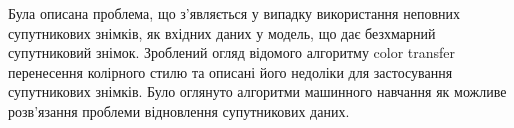 \clearpage
\chapterConclusion
Була описана проблема, що з’являється у випадку використання неповних
супутникових знімків, як вхідних даних у модель, що дає безхмарний
супутниковий знімок. Зроблений огляд відомого алгоритму color transfer
перенесення колірного стилю та описані його недоліки для застосування
супутникових знімків. Було оглянуто алгоритми машинного навчання як
можливе розв'язання проблеми відновлення супутникових даних.